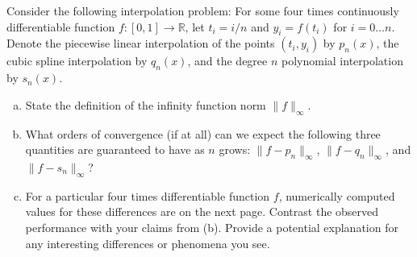 \documentclass[11pt]{article}
\newcommand{\R}{\mathbb{R}}
\newenvironment{problem}[2][Question]{\begin{trivlist}
\item[\hskip \labelsep {\bfseries #1}\hskip \labelsep {\bfseries #2.}]}{\end{trivlist}}
\theoremstyle{definition}
\begin{document}
\begin{problem}{Q2}
Consider the following interpolation problem: For some four times continuously differentiable function $f: [0,1] \rightarrow \R$, let $t_i = i/n$ and $y_i = f(t_i)$ for $i=0\dots n$. Denote the piecewise linear interpolation of the points $(t_i, y_i)$ by $p_n(x)$, the cubic spline interpolation by $q_n(x)$, and the degree $n$ polynomial interpolation by $s_n(x)$.\\

\begin{enumerate}[(a)]
     \item State the definition of the infinity function norm $\|f\|_\infty$.
     \item What orders of convergence (if at all) can we expect the following three quantities are guaranteed to have as $n$ grows: $\|f-p_n\|_\infty$, $\|f-q_n\|_\infty$, and $\|f-s_n\|_\infty$?
     \item For a particular four times differentiable function $f$, numerically computed values for these differences are on the next page. Contrast the observed performance with your claims from (b). Provide a potential explanation for any interesting differences or phenomena you see.



\end{enumerate}
\end{problem}
\end{document}
